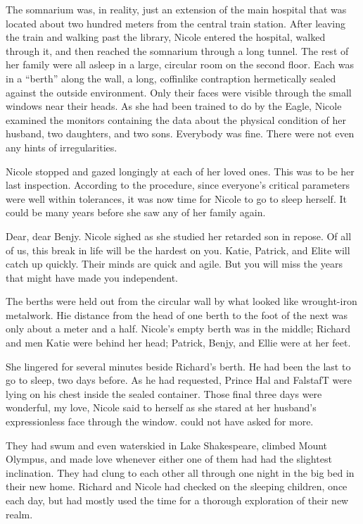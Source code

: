\documentclass[]{article}
\begin{document}
{The somnarium was, in reality, just an extension of the main hospital that was located about two hundred meters from the central train station.  After leaving the train and walking past the library, Nicole entered the hospital, walked through it, and then reached the somnarium through a long tunnel.  The rest of her family were all asleep in a large, circular room on the second floor.  Each was in a “berth” along the wall, a long, coffinlike contraption hermetically sealed against the outside environment.  Only their faces were visible through the small windows near their heads.  As she had been trained to do by the Eagle, Nicole examined the monitors containing the data about the physical condition of her husband, two daughters, and two sons.  Everybody was fine.  There were not even any hints of irregularities.

Nicole stopped and gazed longingly at each of her loved ones.  This was to be her last inspection.  According to the procedure, since everyone’s critical parameters were well within tolerances, it was now time for Nicole to go to sleep herself.  It could be many years before she saw any of her family again.

Dear, dear Benjy.  Nicole sighed as she studied her retarded son in repose.  Of all of us, this break in life will be the hardest on you.  Katie, Patrick, and Elite will catch up quickly.  Their minds are quick and agile.  But you will miss the years that might have made you independent.

The berths were held out from the circular wall by what looked like wrought-iron metalwork.  Hie distance from the head of one berth to the foot of the next was only about a meter and a half.  Nicole’s empty berth was in the middle; Richard and men Katie were behind her head; Patrick, Benjy, and Ellie were at her feet.

She lingered for several minutes beside Richard’s berth.  He had been the last to go to sleep, two days before.  As he had requested, Prince Hal and FalstafT were lying on his chest inside the sealed container.  Those final three days were wonderful, my love, Nicole said to herself as she stared at her husband’s expressionless face through the window.  could not have asked for more.

They had swum and even waterskied in Lake Shakespeare, climbed Mount Olympus, and made love whenever either one of them had had the slightest inclination.  They had clung to each other all through one night in the big bed in their new home.  Richard and Nicole had checked on the sleeping children, once each day, but had mostly used the time for a thorough exploration of their new realm.

}
\end{document}

